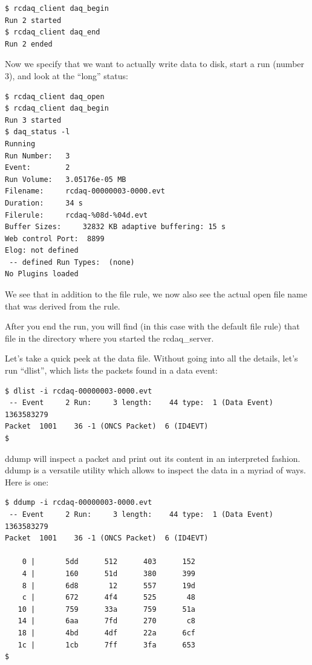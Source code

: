 \documentclass{article}[11pt]
\begin{document}
\begin{verbatim}
$ rcdaq_client daq_begin
Run 2 started
$ rcdaq_client daq_end
Run 2 ended
\end{verbatim}

Now we specify that we want to actually write data to disk, start a
run (number 3), and look at the ``long'' status:

\begin{verbatim}
$ rcdaq_client daq_open
$ rcdaq_client daq_begin
Run 3 started
$ daq_status -l
Running
Run Number:   3
Event:        2
Run Volume:   3.05176e-05 MB
Filename:     rcdaq-00000003-0000.evt
Duration:     34 s
Filerule:     rcdaq-%08d-%04d.evt
Buffer Sizes:     32832 KB adaptive buffering: 15 s
Web control Port:  8899
Elog: not defined
 -- defined Run Types:  (none)
No Plugins loaded
\end{verbatim}

We see that in addition to the file rule, we now also see the actual
open file name that was derived from the rule.

After you end the run, you will find (in this case with the default
file rule) that file in the directory where you started the
rcdaq\_server.

Let's take a quick peek at the data file. Without going into all the
details, let's run ``dlist'', which lists the packets found in a data
event:

\begin{verbatim}
$ dlist -i rcdaq-00000003-0000.evt 
 -- Event     2 Run:     3 length:    44 type:  1 (Data Event)  1363583279
Packet  1001    36 -1 (ONCS Packet)  6 (ID4EVT)
$
\end{verbatim}

ddump will inspect a packet and print out its content in an
interpreted fashion. ddump is a versatile utility which allows to
inspect the data in a myriad of ways. Here is one:

\begin{verbatim}
$ ddump -i rcdaq-00000003-0000.evt
 -- Event     2 Run:     3 length:    44 type:  1 (Data Event)  1363583279
Packet  1001    36 -1 (ONCS Packet)  6 (ID4EVT)

    0 |       5dd      512      403      152 
    4 |       160      51d      380      399 
    8 |       6d8       12      557      19d 
    c |       672      4f4      525       48 
   10 |       759      33a      759      51a 
   14 |       6aa      7fd      270       c8 
   18 |       4bd      4df      22a      6cf 
   1c |       1cb      7ff      3fa      653 
$ 
\end{verbatim}
\end{document}
